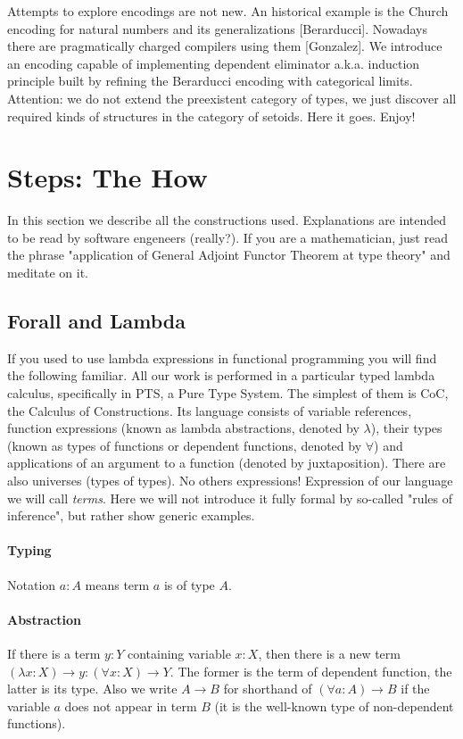 \documentclass[11pt,oneside]{article}
\begin{document}
Attempts to explore encodings are not new. An historical example is the
Church encoding for natural numbers and its generalizations [Berarducci].
Nowadays there are pragmatically charged compilers using them [Gonzalez].
We introduce an encoding capable of implementing dependent eliminator a.k.a.
induction principle built by refining the Berarducci encoding with categorical limits.
Attention: we do not extend the preexistent category of types,
we just discover all required kinds of structures in the category of setoids.
Here it goes. Enjoy!

\section{Steps: The How}

In this section we describe all the constructions used.
Explanations are intended to be read by software engeneers (really?).
If you are a mathematician, just read the phrase
"application of General Adjoint Functor Theorem at type theory" and meditate on it.

\subsection{Forall and Lambda}

If you used to use lambda expressions in functional programming
you will find the following familiar.
All our work is performed in a particular typed lambda calculus,
specifically in PTS, a Pure Type System.
The simplest of them is CoC, the Calculus of Constructions.
Its language consists of variable references,
function expressions (known as lambda abstractions,
denoted by $\lambda$),
their types (known as types of functions or dependent functions,
denoted by $\forall$)
and applications of an argument to a function
(denoted by juxtaposition).
There are also universes (types of types).
No others expressions!
Expression of our language we will call {\em terms}.
Here we will not introduce it fully formal by so-called
"rules of inference", but rather show generic examples.

\paragraph{Typing}
Notation $a : A$ means term $a$ is of type $A$.

\paragraph{Abstraction}
If there is a term $y : Y$ containing variable $x : X$,
then there is a new term
$(\lambda x : X) \rightarrow y : (\forall x : X) \rightarrow Y$.
The former is the term of dependent function, the latter is its type.
Also we write $A \rightarrow B$ for shorthand of
$(\forall a : A) \rightarrow B$ if the variable $a$
does not appear in term $B$
(it is the well-known type of non-dependent functions).
\end{document}
